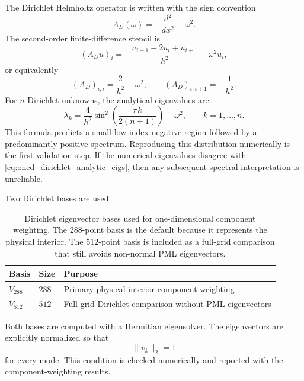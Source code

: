 The Dirichlet Helmholtz operator is written with the sign convention
\begin{equation}
    A_D(\omega) = -\frac{d^2}{dx^2} - \omega^2.
    \label{eq:oned_dirichlet_continuous}
\end{equation}
The second-order finite-difference stencil is
\begin{equation}
    (A_D u)_i =
    -\frac{u_{i-1}-2u_i+u_{i+1}}{h^2} - \omega^2 u_i,
    \label{eq:oned_dirichlet_stencil}
\end{equation}
or equivalently
\begin{equation}
    (A_D)_{i,i} = \frac{2}{h^2} - \omega^2,
    \qquad
    (A_D)_{i,i\pm1} = -\frac{1}{h^2}.
    \label{eq:oned_dirichlet_matrix_entries}
\end{equation}
For $n$ Dirichlet unknowns, the analytical eigenvalues are
\begin{equation}
    \lambda_k
    =
    \frac{4}{h^2}
    \sin^2\!\left(\frac{\pi k}{2(n+1)}\right)
    - \omega^2,
    \qquad k=1,\ldots,n.
    \label{eq:oned_dirichlet_analytic_eigs}
\end{equation}
This formula predicts a small low-index negative region followed by a
predominantly positive spectrum. Reproducing this distribution numerically is
the first validation step. If the numerical eigenvalues disagree with
\eqref{eq:oned_dirichlet_analytic_eigs}, then any subsequent spectral
interpretation is unreliable.

Two Dirichlet bases are used:
\begin{table}[h]
\centering
\begin{tabular}{lll}
\toprule
Basis & Size & Purpose \\
\midrule
$V_{288}$ & $288$ & Primary physical-interior component weighting \\
$V_{512}$ & $512$ & Full-grid Dirichlet comparison without PML eigenvectors \\
\bottomrule
\end{tabular}
\caption{Dirichlet eigenvector bases used for one-dimensional component
weighting. The $288$-point basis is the default because it represents the
physical interior. The $512$-point basis is included as a full-grid comparison
that still avoids non-normal PML eigenvectors.}
\label{tab:oned_dirichlet_bases}
\end{table}

Both bases are computed with a Hermitian eigensolver. The eigenvectors are
explicitly normalized so that
\begin{equation}
    \|v_k\|_2 = 1
    \label{eq:oned_unit_eigenvectors}
\end{equation}
for every mode. This condition is checked numerically and reported with the
component-weighting results.


